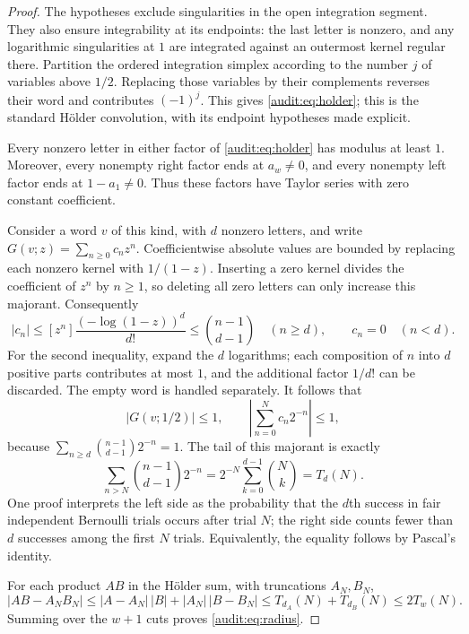 \begin{proof}
The hypotheses exclude singularities in the open integration segment.
They also ensure integrability at its endpoints: the last letter is
nonzero, and any logarithmic singularities at $1$ are integrated against
an outermost kernel regular there. Partition the ordered integration
simplex according to the number $j$ of variables above $1/2$. Replacing
those variables by their complements reverses their word and contributes
$(-1)^j$. This gives \eqref{audit:eq:holder}; this is the standard Hölder
convolution, with its endpoint hypotheses made explicit.

Every nonzero letter in either factor of \eqref{audit:eq:holder} has
modulus at least $1$. Moreover, every nonempty right factor ends at
$a_w\ne0$, and every nonempty left factor ends at $1-a_1\ne0$.
Thus these factors have Taylor series with zero constant coefficient.

Consider a word $v$ of this kind, with $d$ nonzero letters, and write
$G(v;z)=\sum_{n\geq0}c_nz^n$. Coefficientwise absolute values are bounded
by replacing each nonzero kernel with $1/(1-z)$. Inserting a zero kernel
divides the coefficient of $z^n$ by $n\geq1$, so deleting all zero letters
can only increase this majorant. Consequently
\[
 |c_n|\leq[z^n]\frac{(-\log(1-z))^d}{d!}
 \leq\binom{n-1}{d-1}\quad(n\geq d),
 \qquad c_n=0\quad(n<d).
\]
For the second inequality, expand the $d$ logarithms; each composition of
$n$ into $d$ positive parts contributes at most $1$, and the additional
factor $1/d!$ can be discarded. The empty word is handled separately.
It follows that
\[
 |G(v;1/2)|\leq1,\qquad
 \left|\sum_{n=0}^Nc_n2^{-n}\right|\leq1,
\]
because $\sum_{n\geq d}\binom{n-1}{d-1}2^{-n}=1$.
The tail of this majorant is exactly
\[
 \sum_{n>N}\binom{n-1}{d-1}2^{-n}
 =2^{-N}\sum_{k=0}^{d-1}\binom Nk=T_d(N).
\]
One proof interprets the left side as the probability that the $d$th
success in fair independent Bernoulli trials occurs after trial $N$;
the right side counts fewer than $d$ successes among the first $N$
trials. Equivalently, the equality follows by Pascal's identity.

For each product $AB$ in the Hölder sum, with truncations $A_N,B_N$,
\[
 |AB-A_NB_N|
 \leq |A-A_N|\,|B|+|A_N|\,|B-B_N|
 \leq T_{d_A}(N)+T_{d_B}(N)\leq2T_w(N).
\]
Summing over the $w+1$ cuts proves \eqref{audit:eq:radius}.


\end{proof}

